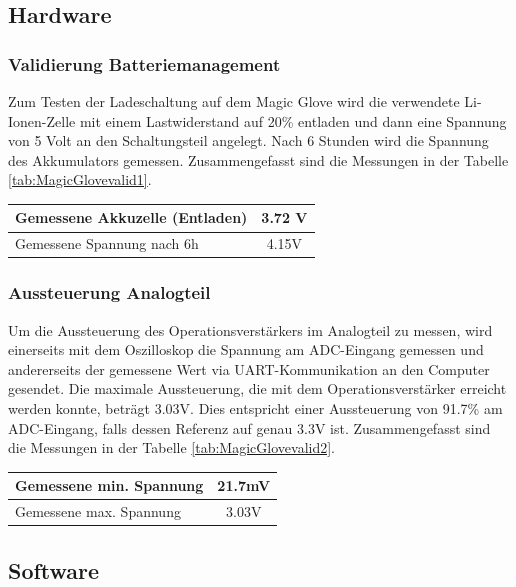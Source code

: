 \subsection{Hardware}
\subsubsection*{Validierung Batteriemanagement}
Zum Testen der Ladeschaltung auf dem Magic Glove wird die verwendete Li-Ionen-Zelle mit einem Lastwiderstand auf 20\% entladen und dann eine Spannung von 5 Volt an den Schaltungsteil angelegt. Nach 6 Stunden wird die Spannung des Akkumulators gemessen. Zusammengefasst sind die Messungen in der Tabelle \ref{tab:MagicGlovevalid1}.
	\begin{center}
	\begin{tabular}{l|c}
		\hline 
		Gemessene Akkuzelle (Entladen) & 3.72 V \\ \hline
		Gemessene Spannung nach 6h & 4.15V \\ \hline
	\end{tabular} 
	\label{tab:MagicGlovevalid1}
\end{center}

\subsubsection*{Aussteuerung Analogteil}
Um die Aussteuerung des Operationsverstärkers im Analogteil zu messen, wird einerseits mit dem Oszilloskop die Spannung am ADC-Eingang gemessen und andererseits der gemessene Wert via UART-Kommunikation an den Computer gesendet.
Die maximale Aussteuerung, die mit dem Operationsverstärker erreicht werden konnte, beträgt 3.03V. Dies entspricht einer Aussteuerung von 91.7\% am ADC-Eingang, falls dessen Referenz auf genau 3.3V ist. Zusammengefasst sind die Messungen in der Tabelle \ref{tab:MagicGlovevalid2}.
\begin{center}
	\begin{tabular}{l|c}
		\hline 
		Gemessene min. Spannung & 21.7mV \\ \hline
		Gemessene max. Spannung & 3.03V \\ \hline
	\end{tabular} 
	\label{tab:MagicGlovevalid2}
\end{center}

\subsection{Software}
